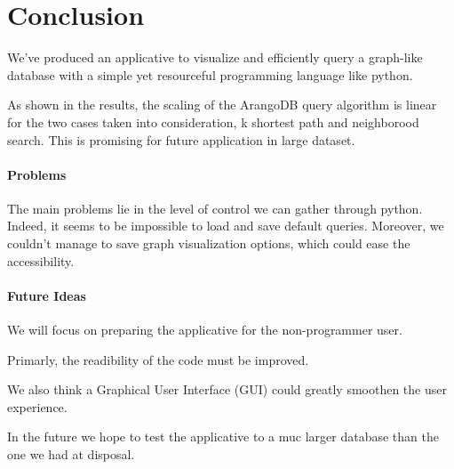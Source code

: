 \documentclass[11pt,twocolumn]{article}
\begin{document}
\section{Conclusion}

We've produced an applicative to visualize and efficiently query a graph-like database with a simple yet resourceful programming language like python.

As shown in the results, the scaling of the ArangoDB query algorithm is linear for the two cases taken into consideration, k shortest path and neighborood search. This is promising for future application in large dataset.

\paragraph{Problems}

The main problems lie in the level of control we can gather through python. Indeed, it seems to be impossible to load and save default queries.
Moreover, we couldn't manage to save graph visualization options, which could ease the accessibility.

\paragraph{Future Ideas} 

We will focus on preparing the applicative for the non-programmer user.

Primarly, the readibility of the code must be improved.

We also think a Graphical User Interface (GUI) could greatly smoothen the user experience. 

In the future we hope to test the applicative to a muc larger database than the one we had at disposal.

\twocolumn[
\begin{@twocolumnfalse}
 

\end{@twocolumnfalse}
]
\end{document}
